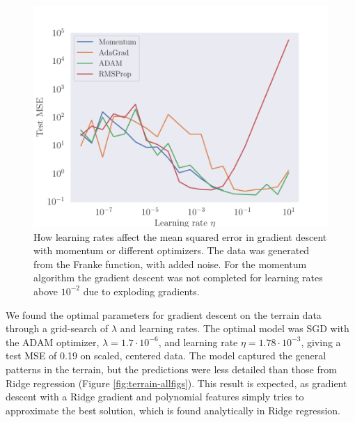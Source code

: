 \begin{figure}
    \centering
    \includegraphics[width=0.99\linewidth]{examples/tests_even/figs/Franke-learningrates-optimizers.pdf}
    \caption{How learning rates affect the mean squared error in gradient descent with momentum or different optimizers. The data was generated from the Franke function, with added noise. For the momentum algorithm the gradient descent was not completed for learning rates above $10^{-2}$ due to exploding gradients.}
    \label{fig:franke-learningrate}
\end{figure}

We found the optimal parameters for gradient descent on the terrain data through a grid-search of $\lambda$ and learning rates. The optimal model was SGD with the ADAM optimizer, $\lambda=1.7\cdot10^{-6}$, and learning rate $\eta=1.78\cdot10^{-3}$, giving a test MSE of 0.19 on scaled, centered data. The model captured the general patterns in the terrain, but the predictions were less detailed than those from Ridge regression (Figure \ref{fig:terrain-allfigs}). This result is expected, as gradient descent with a Ridge gradient and polynomial features simply tries to approximate the best solution, which is found analytically in Ridge regression.


